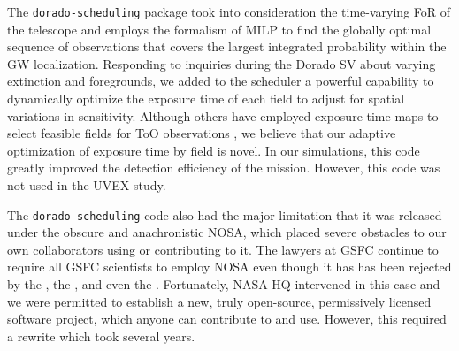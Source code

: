 \documentclass[twocolumn,times]{aastex631}
\begin{document}
The \texttt{dorado-scheduling} package took into consideration the time-varying \ac{FoR} of the telescope and employs the formalism of \ac{MILP} to find the globally optimal sequence of observations that covers the largest integrated probability within the \ac{GW} localization. Responding to inquiries during the Dorado \ac{SV} about varying extinction and foregrounds, we added to the scheduler a powerful capability to dynamically optimize the exposure time of each field to adjust for spatial variations in sensitivity. Although others have employed exposure time maps to select feasible fields for \ac{ToO} observations \citep{2020A&C....3300425H}, we believe that our adaptive optimization of exposure time by field is novel. In our simulations, this code greatly improved the detection efficiency of the mission. However, this code was not used in the \ac{UVEX} study.

The \texttt{dorado-scheduling} code also had the major limitation that it was released under the obscure and anachronistic \ac{NOSA}, which placed severe obstacles to our own collaborators using or contributing to it. The lawyers at \ac{GSFC} continue to require all \ac{GSFC} scientists to employ \ac{NOSA} even though it has has been rejected by the \citet{FSF}, the \citet{NAP25217}, and even the \citet{SMD}. Fortunately, NASA \ac{HQ} intervened in this case and we were permitted to establish a new, truly open-source, permissively licensed software project, which anyone can contribute to and use. However, this required a rewrite which took several years.
\end{document}
